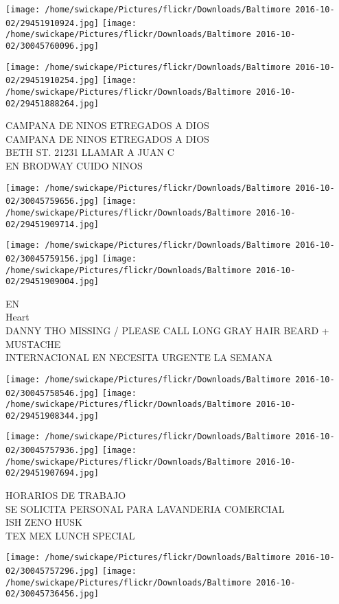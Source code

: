 \documentclass[10pt,letterpaper]{article}
\begin{document}
\texttt{[image: /home/swickape/Pictures/flickr/Downloads/Baltimore 2016-10-02/29451910924.jpg]}
\texttt{[image: /home/swickape/Pictures/flickr/Downloads/Baltimore 2016-10-02/30045760096.jpg]}

\texttt{[image: /home/swickape/Pictures/flickr/Downloads/Baltimore 2016-10-02/29451910254.jpg]}
\texttt{[image: /home/swickape/Pictures/flickr/Downloads/Baltimore 2016-10-02/29451888264.jpg]}

CAMPANA DE NINOS ETREGADOS A DIOS\\
CAMPANA DE NINOS ETREGADOS A DIOS\\
BETH ST. 21231 LLAMAR A JUAN C\\
EN BRODWAY CUIDO NINOS
\pagebreak

\texttt{[image: /home/swickape/Pictures/flickr/Downloads/Baltimore 2016-10-02/30045759656.jpg]}
\texttt{[image: /home/swickape/Pictures/flickr/Downloads/Baltimore 2016-10-02/29451909714.jpg]}

\texttt{[image: /home/swickape/Pictures/flickr/Downloads/Baltimore 2016-10-02/30045759156.jpg]}
\texttt{[image: /home/swickape/Pictures/flickr/Downloads/Baltimore 2016-10-02/29451909004.jpg]}

EN\\
Heart\\
DANNY THO MISSING / PLEASE CALL LONG GRAY HAIR BEARD + MUSTACHE\\
INTERNACIONAL EN NECESITA URGENTE LA SEMANA
\pagebreak

\texttt{[image: /home/swickape/Pictures/flickr/Downloads/Baltimore 2016-10-02/30045758546.jpg]}
\texttt{[image: /home/swickape/Pictures/flickr/Downloads/Baltimore 2016-10-02/29451908344.jpg]}

\texttt{[image: /home/swickape/Pictures/flickr/Downloads/Baltimore 2016-10-02/30045757936.jpg]}
\texttt{[image: /home/swickape/Pictures/flickr/Downloads/Baltimore 2016-10-02/29451907694.jpg]}

HORARIOS DE TRABAJO\\
SE SOLICITA PERSONAL PARA LAVANDERIA COMERCIAL\\
ISH ZENO HUSK\\
TEX MEX LUNCH SPECIAL
\pagebreak

\texttt{[image: /home/swickape/Pictures/flickr/Downloads/Baltimore 2016-10-02/30045757296.jpg]}
\texttt{[image: /home/swickape/Pictures/flickr/Downloads/Baltimore 2016-10-02/30045736456.jpg]}
\end{document}
